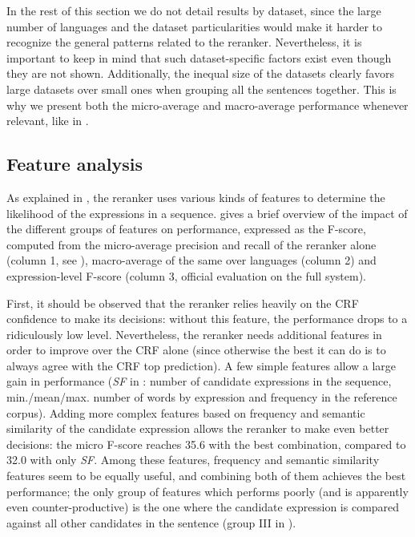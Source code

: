 \documentclass[output=paper,modfonts,nonflat]{langsci/langscibook}
\begin{document}
In the rest of this section we do not detail results by dataset, since
the large number of languages and the dataset particularities would
make it harder to recognize the general patterns related to the
reranker.
Nevertheless, it is important to keep in mind that such
dataset-specific factors exist even though they are not
shown. Additionally, the inequal size of the datasets clearly favors
large datasets over small ones when grouping all the sentences
together. This is why we present both the micro-average and
macro-average performance whenever relevant, like in .


\subsection{Feature analysis}
\label{moreau:sec:featuresAnalysis}


As explained in , the reranker uses various kinds of
features to determine the likelihood of the expressions in a
sequence.  gives a brief overview of
the impact of the different groups of features on performance,
expressed as the F-score, computed from the micro-average precision
and recall of the reranker alone (column 1, see
), macro-average of the same over languages
(column 2) and expression-level F-score (column 3, official evaluation
on the full system).

First, it should be observed that the reranker relies heavily on the
CRF confidence to make its decisions: without this feature, the
performance drops to a ridiculously low level. Nevertheless, the
reranker needs additional features in order to improve over the CRF
alone (since otherwise the best it can do is to always agree with the
CRF top prediction). A few simple features allow a large gain in performance ({\em SF} in 
: number of candidate expressions in the
sequence, min./mean/max. number of words by expression and frequency
in the reference corpus). Adding more
complex features based on frequency and semantic similarity of the
candidate expression allows the reranker to make even better decisions:
the micro F-score reaches 35.6 with the best combination, compared to
32.0 with only {\em SF}. Among these features, frequency and semantic
similarity features seem to be equally useful, and combining both of them
achieves the best performance; the only group of features which
performs poorly (and is apparently even counter-productive) is the one
where the candidate expression is compared against all
other candidates in the sentence (group III in
).
\end{document}
